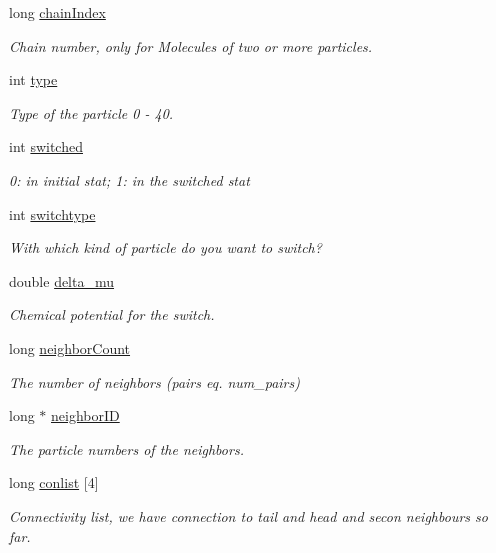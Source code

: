 \begin{DoxyCompactItemize}
long \hyperlink{class_particle_a9b75fd3fa9351d7d3fd7aa5a5170a809}{chain\+Index}
\begin{DoxyCompactList}\small\item\em Chain number, only for Molecules of two or more particles. \end{DoxyCompactList}\item 
int \hyperlink{class_particle_a2b73dd42bcd56ba2e7ffeb0a5515a866}{type}
\begin{DoxyCompactList}\small\item\em Type of the particle 0 -\/ 40. \end{DoxyCompactList}\item 
int \hyperlink{class_particle_af14e7acdc74120025282ea901e11ef69}{switched}
\begin{DoxyCompactList}\small\item\em 0\+: in initial stat; 1\+: in the switched stat \end{DoxyCompactList}\item 
int \hyperlink{class_particle_ae44cd3609cd01ff2e66edc58c64de10e}{switchtype}
\begin{DoxyCompactList}\small\item\em With which kind of particle do you want to switch? \end{DoxyCompactList}\item 
double \hyperlink{class_particle_a14464961ee5c7acbcfebddb72156e1bd}{delta\+\_\+mu}
\begin{DoxyCompactList}\small\item\em Chemical potential for the switch. \end{DoxyCompactList}\item 
long \hyperlink{class_particle_a66f7e76a4292ea79499e062667a46409}{neighbor\+Count}
\begin{DoxyCompactList}\small\item\em The number of neighbors (pairs eq. num\+\_\+pairs) \end{DoxyCompactList}\item 
long $\ast$ \hyperlink{class_particle_a0d119c0ca1644995840d35b701afb566}{neighbor\+I\+D}
\begin{DoxyCompactList}\small\item\em The particle numbers of the neighbors. \end{DoxyCompactList}\item 
long \hyperlink{class_particle_aea82d73fc279e2b1d9d837e6a0873b30}{conlist} \mbox{[}4\mbox{]}
\begin{DoxyCompactList}\small\item\em Connectivity list, we have connection to tail and head and secon neighbours so far. \end{DoxyCompactList}\end{DoxyCompactItemize}


